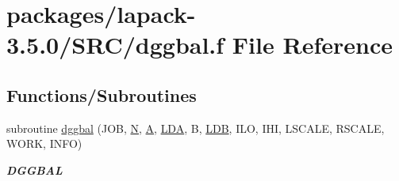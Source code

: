 \hypertarget{dggbal_8f}{}\section{packages/lapack-\/3.5.0/\+S\+R\+C/dggbal.f File Reference}
\label{dggbal_8f}
\subsection*{Functions/\+Subroutines}
\begin{DoxyCompactItemize}
\item 
subroutine \hyperlink{group__doubleGBcomputational_gab41eb79b2fdb2937f01bc8806d8ff4b1}{dggbal} (J\+O\+B, \hyperlink{polmisc_8c_a0240ac851181b84ac374872dc5434ee4}{N}, \hyperlink{classA}{A}, \hyperlink{example__user_8c_ae946da542ce0db94dced19b2ecefd1aa}{L\+D\+A}, B, \hyperlink{example__user_8c_a50e90a7104df172b5a89a06c47fcca04}{L\+D\+B}, I\+L\+O, I\+H\+I, L\+S\+C\+A\+L\+E, R\+S\+C\+A\+L\+E, W\+O\+R\+K, I\+N\+F\+O)
\begin{DoxyCompactList}\small\item\em {\bfseries D\+G\+G\+B\+A\+L} \end{DoxyCompactList}\end{DoxyCompactItemize}
